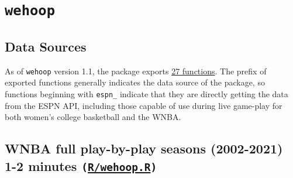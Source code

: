 \documentclass[12pt]{article}
\begin{document}
\section{\texttt{wehoop}}
\subsection{Data Sources}
As of \texttt{wehoop} version 1.1, the package exports \href{https://saiemgilani.github.io/wehoop/reference/index.html}{27 functions}. The prefix of exported functions generally indicates the data source of the package, so functions beginning with \texttt{espn\_} indicate that they are directly getting the data from the ESPN API, including those capable of use during live game-play for both women's college basketball and the WNBA.  
\subsection{WNBA full play-by-play seasons (2002-2021) ~ 1-2 minutes \texttt{(\href{https://github.com/saiemgilani/The\_SportsDataverse\_Initiative/R/wehoop.R}{R/wehoop.R})}}
\end{document}
